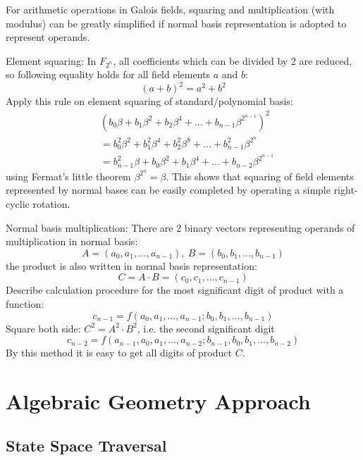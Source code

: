 For arithmetic operations in Galois fields, squaring and multiplication (with modulus) can be greatly simplified if 
normal basis representation is adopted to represent operands.
\begin{Example}
\label{ex:nb_sq}
Element squaring: In $F_{2^n}$, all coefficients which can be divided by 2 are reduced, so 
following equality holds for all field elements $a$ and $b$:
$$(a+b)^2 = a^2 + b^2$$ 
Apply this rule on element squaring of standard/polynomial basis:
\begin{align}
& (b_0\beta + b_1\beta^2 + b_2\beta^4 + \dots + b_{n-1}\beta^{2^{n-1}})^2 \nonumber\\
&= b_0^2\beta^2 + b_1^2\beta^4 + b_2^2\beta^8 + \dots + b_{n-1}^2\beta^{2^n} \nonumber\\
&= b_{n-1}^2\beta + b_0\beta^2 + b_1\beta^4 + \dots + b_{n-2}\beta^{2^{n-1}} \nonumber
\end{align}
using Fermat's little theorem $\beta^{2^n} = \beta$. This shows that squaring of field elements
represented by normal bases can be easily completed by operating a simple right-cyclic rotation.
\end{Example}

\begin{Example}
\label{ex:onb_multi}
Normal basis multiplication: There are 2 binary vectors representing operands of multiplication in normal
basis: $$A = (a_0, a_1, \dots, a_{n-1}),\ B = (b_0, b_1, \dots, b_{n-1})$$ 
the product is also written in normal basis representation: $$C = A\cdot B = (c_0, c_1, \dots, c_{n-1})$$
Describe calculation procedure for the most significant digit of product with a function: 
$$c_{n-1} = f(a_0, a_1, \dots, a_{n-1}; b_0, b_1, \dots, b_{n-1})$$
Square both side: $C^2 = A^2\cdot B^2$, i.e. the second significant digit 
$$c_{n-2} = f(a_{n-1}, a_0, a_1, \dots, a_{n-2}; b_{n-1}, b_0, b_1, \dots, b_{n-2})$$ 
By this method it is easy to get all digits of product $C$.
\end{Example}
  
\section{Algebraic Geometry Approach}
\subsection{State Space Traversal}

